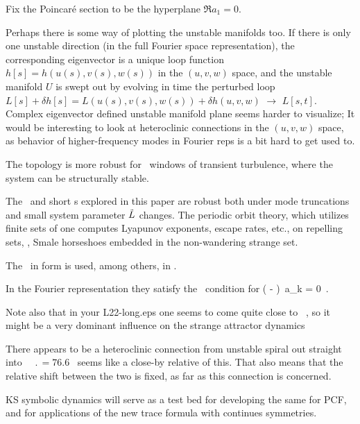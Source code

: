 Fix the  Poincar\'e section to be the hyperplane $\Re a_1=0$.

\bigskip

Perhaps there is some way of plotting the unstable manifolds too. If
there is only one unstable direction (in the full Fourier space
representation), the corresponding eigenvector is a unique loop function
$h[s] =  h(u(s),v(s),w(s))$ in the $(u,v,w)$ space, and the unstable manifold
$U$ is swept out by evolving in time the perturbed loop
$L[s] + \delta h[s] =  L(u(s),v(s),w(s)) + \delta h(u,v,w)$
$\to$ $L[s,t]$.
Complex eigenvector defined unstable manifold plane seems
harder to visualize;  It would be interesting
to look at heteroclinic connections in the $(u,v,w)$ space, as
behavior of higher-frequency modes in Fourier reps is a bit
hard to get used to.

\bigskip

The topology is more robust for \tildeL\ windows
of transient turbulence, where the system can be
structurally stable.

The \eqva\ and short \po s explored in this paper
are robust both under mode truncations and small
system parameter $\tilde{L}$ changes.
The periodic orbit theory, which utilizes finite sets
of
one computes Lyapunov exponents, escape rates, etc.,
on {repelling sets}, \ie, Smale horseshoes embedded in the
non-wandering strange set.

\bigskip

The \KSe\ in  form  is used, among others, in
.

\bigskip

In the Fourier representation they satisfy
the \eqv\ condition for 
\beq
\left(  -   \right)\, a_k
  = 0
\,.
\label{eq:stfks}
\eeq

\bigskip

Note also that in your L22-long.eps one seems
to come quite close to ~\eqv, so it might be a very dominant
influence on the strange attractor dynamics


There appears to be a heteroclinic connection from 
{\eqv}
unstable spiral out straight into ~{\eqv}
$\period{} = 76.6$ \rpo\ seems like a close-by
relative of this.
That also means that the relative shift between the two {\eqva} is
fixed, as far as this connection is concerned.

KS symbolic dynamics will
serve as a test bed for developing the
same for PCF, and for applications of the new
trace formula with continues symmetries.

